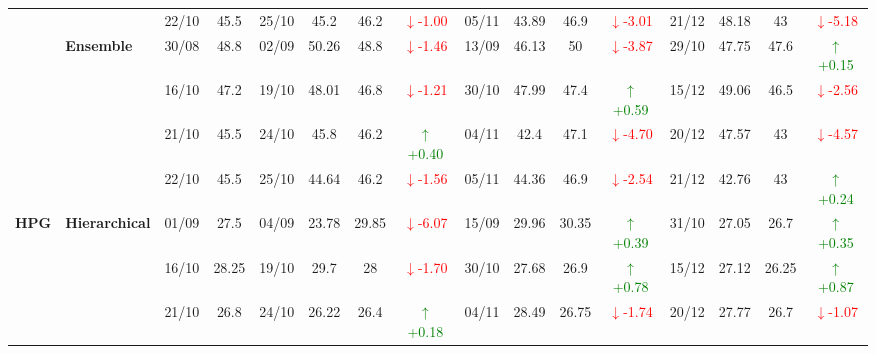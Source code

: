 {\begin{longtable}{llcc|cccc|cccc|cccc}
&
& 22/10 & 45.5 & 25/10 & 45.2 & 46.2 & \textcolor{red}{\(\downarrow\)-1.00} & 05/11 & 43.89 & 46.9 & \textcolor{red}{\(\downarrow\)-3.01} & 21/12 & 48.18 & 43 & \textcolor{red}{\(\downarrow\)-5.18} \\
\cmidrule(lr){2-16}



& \textbf{Ensemble}
& 30/08 & 48.8 & 02/09 & 50.26 & 48.8 & \textcolor{red}{\(\downarrow\)-1.46} & 13/09 & 46.13 & 50 & \textcolor{red}{\(\downarrow\)-3.87} & 29/10 & 47.75 & 47.6 & \textcolor{green}{\(\uparrow\)+0.15} \\

&
& 16/10 & 47.2 & 19/10 & 48.01 & 46.8 & \textcolor{red}{\(\downarrow\)-1.21} & 30/10 & 47.99 & 47.4 & \textcolor{green}{\(\uparrow\)+0.59} & 15/12 & 49.06 & 46.5 & \textcolor{red}{\(\downarrow\)-2.56} \\

&
& 21/10 & 45.5 & 24/10 & 45.8 & 46.2 & \textcolor{green}{\(\uparrow\)+0.40} & 04/11 & 42.4 & 47.1 & \textcolor{red}{\(\downarrow\)-4.70} & 20/12 & 47.57 & 43 & \textcolor{red}{\(\downarrow\)-4.57} \\

&
& 22/10 & 45.5 & 25/10 & 44.64 & 46.2 & \textcolor{red}{\(\downarrow\)-1.56} & 05/11 & 44.36 & 46.9 & \textcolor{red}{\(\downarrow\)-2.54} & 21/12 & 42.76 & 43 & \textcolor{green}{\(\uparrow\)+0.24} \\
\midrule


\multirow{12}{*}{\textbf{HPG}} 
& \textbf{Hierarchical}
& 01/09 & 27.5 & 04/09 & 23.78 & 29.85 & \textcolor{red}{\(\downarrow\)-6.07} & 15/09 & 29.96 & 30.35 & \textcolor{green}{\(\uparrow\)+0.39} & 31/10 & 27.05 & 26.7 & \textcolor{green}{\(\uparrow\)+0.35} \\

& 
& 16/10 & 28.25 & 19/10 & 29.7 & 28 & \textcolor{red}{\(\downarrow\)-1.70} & 30/10 & 27.68 & 26.9 & \textcolor{green}{\(\uparrow\)+0.78} & 15/12 & 27.12 & 26.25 & \textcolor{green}{\(\uparrow\)+0.87} \\

& 
& 21/10 & 26.8 & 24/10 & 26.22 & 26.4 & \textcolor{green}{\(\uparrow\)+0.18} & 04/11 & 28.49 & 26.75 & \textcolor{red}{\(\downarrow\)-1.74} & 20/12 & 27.77 & 26.7 & \textcolor{red}{\(\downarrow\)-1.07} \\


\end{longtable}}
